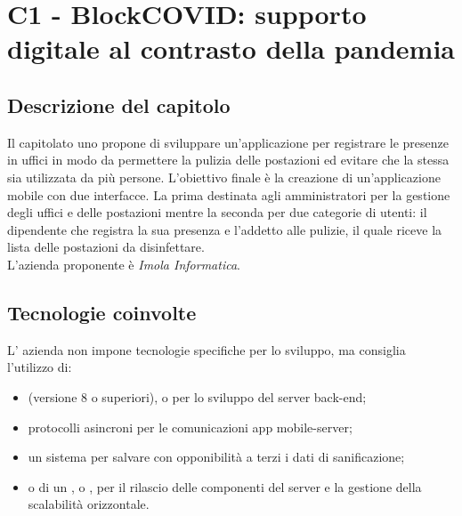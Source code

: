 \section{C1 - BlockCOVID: supporto digitale al contrasto della pandemia}
\subsection{Descrizione del capitolo}
Il capitolato uno propone di sviluppare un'applicazione per registrare le presenze in uffici in modo da permettere la pulizia delle postazioni ed evitare che la stessa sia utilizzata da più persone.
L'obiettivo finale è la creazione di un'applicazione mobile con due interfacce. La prima destinata agli amministratori per la gestione degli uffici e delle postazioni mentre la seconda per due categorie di utenti: il dipendente che registra la sua presenza e l'addetto alle pulizie, il quale riceve la lista delle postazioni da disinfettare.\\
L'azienda proponente è \textit{Imola Informatica}.

\subsection{Tecnologie coinvolte}
L' azienda non impone tecnologie specifiche per lo sviluppo, ma consiglia l'utilizzo di:
\begin{itemize}
\item {} (versione 8 o superiori),  o  per lo sviluppo del server back-end;
\item	protocolli asincroni per le comunicazioni app mobile-server;
\item	un sistema  per salvare con opponibilità a terzi i dati di sanificazione;
\item	{} o di un ,  o , per il rilascio delle componenti del server e la gestione della scalabilità orizzontale.
\end{itemize}

